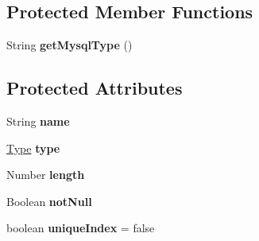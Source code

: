 \subsection*{Protected Member Functions}
\begin{DoxyCompactItemize}
\item 
\mbox{\label{classcom_1_1mysql_1_1cj_1_1xdevapi_1_1_abstract_column_def_a22068306f5eba4cdc8515ffb4f8fb95a}} 
String {\bfseries get\+Mysql\+Type} ()
\end{DoxyCompactItemize}
\subsection*{Protected Attributes}
\begin{DoxyCompactItemize}
\item 
\mbox{\label{classcom_1_1mysql_1_1cj_1_1xdevapi_1_1_abstract_column_def_a4db4c67f053ba22dcaa75459c5fa68c3}} 
String {\bfseries name}
\item 
\mbox{\label{classcom_1_1mysql_1_1cj_1_1xdevapi_1_1_abstract_column_def_ad9708106f48191a9e6442fe1b2c5641d}} 
\mbox{\hyperlink{enumcom_1_1mysql_1_1cj_1_1xdevapi_1_1_type}{Type}} {\bfseries type}
\item 
\mbox{\label{classcom_1_1mysql_1_1cj_1_1xdevapi_1_1_abstract_column_def_a78d0c29138f467d0a661dacc2700ceab}} 
Number {\bfseries length}
\item 
\mbox{\label{classcom_1_1mysql_1_1cj_1_1xdevapi_1_1_abstract_column_def_abb40ee636a965f01d902673dc919fbba}} 
Boolean {\bfseries not\+Null}
\item 
\mbox{\label{classcom_1_1mysql_1_1cj_1_1xdevapi_1_1_abstract_column_def_a659651092323c1e7020c7b3736e112a7}} 
boolean {\bfseries unique\+Index} = false
\item 
\mbox{\label{classcom_1_1mysql_1_1cj_1_1xdevapi_1_1_abstract_column_def_a1423c7e3a878867c655235240c5fa8cc}} 

\end{DoxyCompactItemize}
